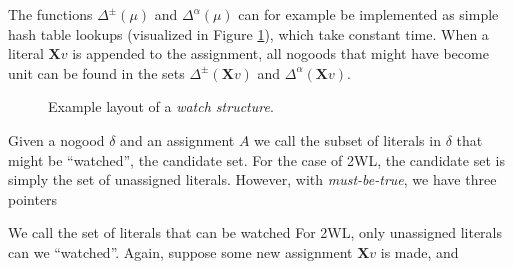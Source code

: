 \documentclass{vutinfth} %
\newcommand{\mbt}{must-be-true\xspace}
\newcommand{\ass}{A}
\newcommand{\bX}{\mathbf{X}}
\newcommand{\dpm}{\Delta^\pm}
\newcommand{\dal}{\Delta^\alpha}
\newcommand{\sgl}{\mu}
\begin{document}
The functions $\dpm(\sgl)$ and $\dal(\sgl)$ can for example be implemented as simple hash table lookups (visualized in Figure \ref{fig:watches}), which take constant time. When a literal $\bX v$ is appended to the assignment, all nogoods that might have become unit can be found in the sets $\dpm(\bX v)$ and $\dal(\bX v)$.


\begin{figure}
  \centering
{}
  \caption{Example layout of a \emph{watch structure}.}
  \label{fig:watches} %
\end{figure}

Given a nogood $\delta$ and an assignment $\ass$ we call the subset of literals in $\delta$ that might be \enquote{watched}, the candidate set. For the case of 2WL, the candidate set is simply the set of unassigned literals. However, with \emph{\mbt}, we have three pointers 

We call the set of literals that can be watched
For 2WL, only unassigned literals can we \enquote{watched}. Again, suppose some new assignment $\bX v$ is made, and 
\end{document}
